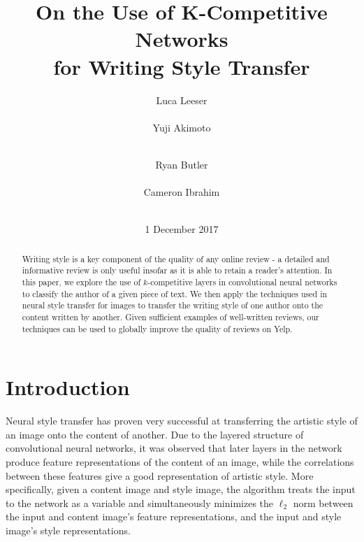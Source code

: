 \documentclass{vldb}
\begin{document}

\title{On the Use of K-Competitive Networks \\ for Writing Style Transfer}



\author{
\alignauthor
Luca Leeser\\
       \\
\alignauthor
Yuji Akimoto\\
       \\
\and
\alignauthor 
Ryan Butler\\
       \\
\alignauthor 
Cameron Ibrahim\\
       \\
}

\date{1 December 2017}

\maketitle

\begin{abstract}
Writing style is a key component of the quality of any online review - a detailed and informative review is only useful insofar as it is able to retain a reader's attention. In this paper, we explore the use of $k$-competitive layers in convolutional neural networks to classify the author of a given piece of text. We then apply the techniques used in neural style transfer for images to transfer the writing style of one author onto the content written by another. Given sufficient examples of well-written reviews, our techniques can be used to globally improve the quality of reviews on Yelp.
\end{abstract}

\section{Introduction}
Neural style transfer \cite{GatysEB15a} has proven very successful at transferring the artistic style of an image onto the content of another. Due to the layered structure of convolutional neural networks, it was observed that later layers in the network produce feature representations of the content of an image, while the correlations between these features give a good representation of artistic style. More specifically, given a content image and style image, the algorithm treats the input to the network as a variable and simultaneously minimizes the $\ell_2$ norm between the input and content image's feature representations, and the input and style image's style representations.
\end{document}
